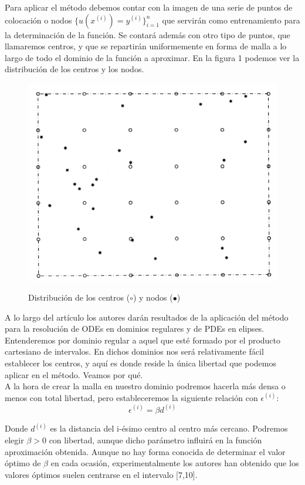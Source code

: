 \documentclass[12pt]{article}       %
\begin{document}
Para aplicar el método debemos contar con la imagen de una serie de puntos de colocación o nodos $\{u(x^{(i)})=y^{(i)}\}_{i=1}^{n}$ que servirán como entrenamiento para la determinación de la función. Se contará además con otro tipo de puntos, que llamaremos centros, y que se repartirán uniformemente en forma de malla a lo largo de todo el dominio de la función a aproximar. En la figura 1 podemos ver la distribución de los centros y los nodos.\\

\begin{figure}
\centering
\includegraphics[scale=0.45]{img/centros}
\label{figura1}
\caption{Distribución de los centros ($\circ$) y nodos ($\bullet$)} 
\end{figure}

A lo largo del artículo los autores darán resultados de la aplicación del método para la resolución de ODEs en dominios regulares y de PDEs en elipses. Entenderemos por dominio regular a aquel que esté formado por el producto cartesiano de intervalos. En dichos dominios nos será relativamente fácil establecer los centros, y aquí es donde reside la única libertad que podemos aplicar en el método. Veamos por qué.\\

A la hora de crear la malla en nuestro dominio podremos hacerla más densa o menos con total libertad, pero estableceremos la siguiente relación con $\epsilon^{(i)}$:
$$\epsilon^{(i)} = \beta d^{(i)}$$

Donde $d^{(i)}$ es la distancia del i-ésimo centro al centro más cercano. Podremos elegir $\beta > 0$ con libertad, aunque dicho parámetro influirá en la función aproximación obtenida. Aunque no hay forma conocida de determinar el valor óptimo de $\beta$ en cada ocasión, experimentalmente los autores han obtenido que los valores óptimos suelen centrarse en el intervalo [7,10].\\
\end{document}
